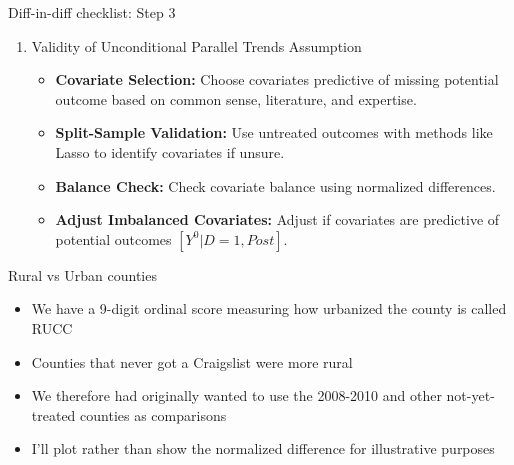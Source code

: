 \documentclass{beamer}
\begin{document}
\begin{frame}{Diff-in-diff checklist: Step 3}

\begin{enumerate}
\item[3. ] Validity of Unconditional Parallel Trends Assumption

    \begin{itemize}
        \item \textbf{Covariate Selection:} Choose covariates predictive of missing potential outcome based on common sense, literature, and expertise.
        \item \textbf{Split-Sample Validation:} Use untreated outcomes with methods like Lasso to identify covariates if unsure.
        \item \textbf{Balance Check:} Check covariate balance using normalized differences.
        \item \textbf{Adjust Imbalanced Covariates:} Adjust if covariates are predictive of potential outcomes $[Y^0|D=1, Post]$.
    \end{itemize}
\end{enumerate}
\end{frame}

\begin{frame}{Rural vs Urban counties}

\begin{itemize}
\item We have a 9-digit ordinal score measuring how urbanized the county is called RUCC
\item Counties that never got a Craigslist were more rural
\item We therefore had originally wanted to use the 2008-2010 and other not-yet-treated counties as comparisons
\item I'll plot rather than show the normalized difference for illustrative purposes
\end{itemize}
\end{frame}
\end{document}
